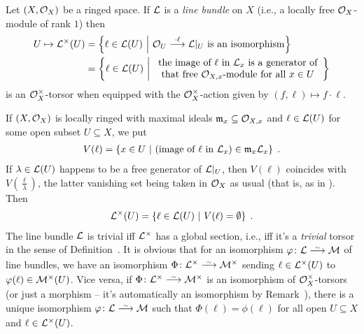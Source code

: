\documentclass[a4paper,parskip=half,numbers=enddot, DIV=12]{scrreprt}
\begin{document}
\begin{example}
	\begin{alphanumerate}
		\item {}Let $(X,\mathcal{O}_X)$ be a ringed space. If $\mathcal{L}$ is a \emph{line bundle} on $X$ (i.e., a locally free $\mathcal{O}_X$-module of rank $1$) then
		\begin{align*}
			U\mapsto \Ll^\times(U)&=\left\{\ell\in\Ll(U)\st \Oo_U\morphism[\cdot \ell]\Ll|_U\text{ is an isomorphism}\right\}\\
			&=\left\{\ell\in\Ll(U)\st 
			\begin{array}{c}
				\text{the image of }\ell \text{ in }\Ll_x\text{ is a generator of}\\
				\text{that free }\Oo_{X,x}\text{-module for all }x\in U
			\end{array}
			\right\}
		\end{align*}
		is an $\mathcal{O}_X^\times$-torsor when equipped with the $\mathcal{O}_X^\times$-action given by $(f,\ell)\mapsto f\cdot \ell$.
		
		If $(X,\mathcal{O}_X)$ is locally ringed with maximal ideals $\mathfrak{m}_x\subseteq \mathcal{O}_{X,x}$ and $\ell\in\mathcal{L}(U)$ for some open subset $U\subseteq X$, we put
		\begin{align*}
			V(\ell)=\left\{x\in U\ \middle|\  (\text{image of }\ell\text{ in }\mathcal{L}_x)\in\mathfrak{m}_x\mathcal{L}_x\right\}\;.
		\end{align*}
		If $\lambda\in\mathcal{L}(U)$ happens to be a free generator of $\mathcal{L}|_U$, then $V(\ell)$ coincides with $V\left(\frac{\ell}{\lambda}\right)$, the latter vanishing set being taken in $\mathcal{O}_X$ as usual (that is, as in \cite[Definition~1.3.3]{alg1}). Then
		\begin{align*}
			\mathcal{L}^\times (U)=\left\{\ell\in\mathcal{L}(U)\ \middle|\  V(\ell)=\emptyset\right\}\;.
		\end{align*}
		The line bundle $\mathcal{L}$ is trivial iff $\mathcal{L}^\times$ has a global section, i.e., iff it's a \emph{trivial} torsor in  the sense of Definition~. It is obvious that for an isomorphism $\phi\colon \Ll\isomorphism\Mm$ of line bundles, we have an isomorphism $\Phi\colon \Ll^\times \isomorphism\Mm^\times$ sending $\ell\in\mathcal{L}^\times(U)$ to $\varphi(\ell)\in\mathcal{M}^\times (U)$. Vice versa, if $\Phi\colon \Ll^\times \isomorphism\Mm^\times $ is an isomorphism of $\mathcal{O}_X^\times$-torsors (or just a morphism -- it's automatically an isomorphism by Remark~), there is a unique isomorphism $\phi\colon \Ll\isomorphism\Mm$ such that $\Phi(\ell)=\phi(\ell)$ for all open $U\subseteq X$ and $\ell\in\mathcal{L}^\times(U)$.
		

\end{alphanumerate}
\end{example}
\end{document}

